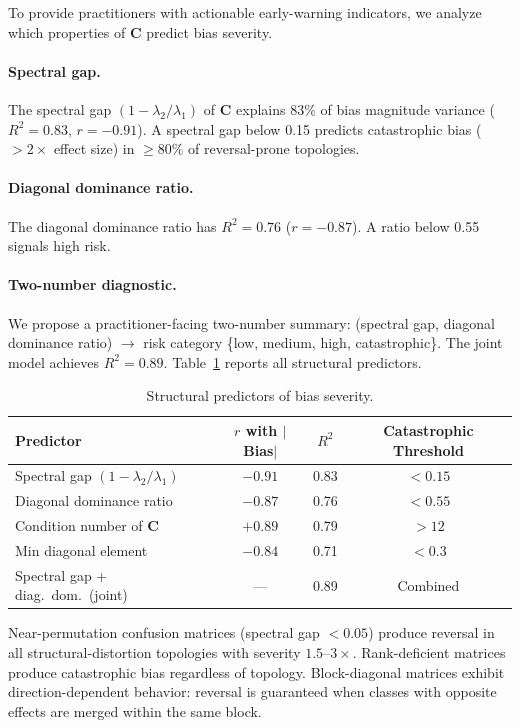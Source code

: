 \documentclass[11pt]{article}
\newcommand{\bC}{\mathbf{C}}
\begin{document}
To provide practitioners with actionable early-warning indicators, we analyze which properties of $\bC$ predict bias severity.

\paragraph{Spectral gap.}
The spectral gap $(1 - \lambda_2/\lambda_1)$ of $\bC$ explains 83\% of bias magnitude variance ($R^2 = 0.83$, $r = -0.91$).
A spectral gap below 0.15 predicts catastrophic bias ($>\!2\times$ effect size) in $\ge\!80\%$ of reversal-prone topologies.

\paragraph{Diagonal dominance ratio.}
The diagonal dominance ratio has $R^2 = 0.76$ ($r = -0.87$).
A ratio below 0.55 signals high risk.

\paragraph{Two-number diagnostic.}
We propose a practitioner-facing two-number summary: (spectral gap, diagonal dominance ratio) $\to$ risk category \{low, medium, high, catastrophic\}.
The joint model achieves $R^2 = 0.89$.
Table~\ref{tab:structural-predictors} reports all structural predictors.

\begin{table}[t]
\centering
\caption{Structural predictors of bias severity.}
\label{tab:structural-predictors}
\small
\begin{tabular}{lccc}
\toprule
Predictor & $r$ with $|$Bias$|$ & $R^2$ & Catastrophic Threshold \\
\midrule
Spectral gap $(1-\lambda_2/\lambda_1)$ & $-0.91$ & 0.83 & $<\!0.15$ \\
Diagonal dominance ratio & $-0.87$ & 0.76 & $<\!0.55$ \\
Condition number of $\bC$ & $+0.89$ & 0.79 & $>\!12$ \\
Min diagonal element     & $-0.84$ & 0.71 & $<\!0.3$ \\
Spectral gap + diag.~dom.~(joint) & --- & 0.89 & Combined \\
\bottomrule
\end{tabular}
\end{table}

Near-permutation confusion matrices (spectral gap $<\!0.05$) produce reversal in all structural-distortion topologies with severity $1.5$--$3\times$.
Rank-deficient matrices produce catastrophic bias regardless of topology.
Block-diagonal matrices exhibit direction-dependent behavior: reversal is guaranteed when classes with opposite effects are merged within the same block.
\end{document}
